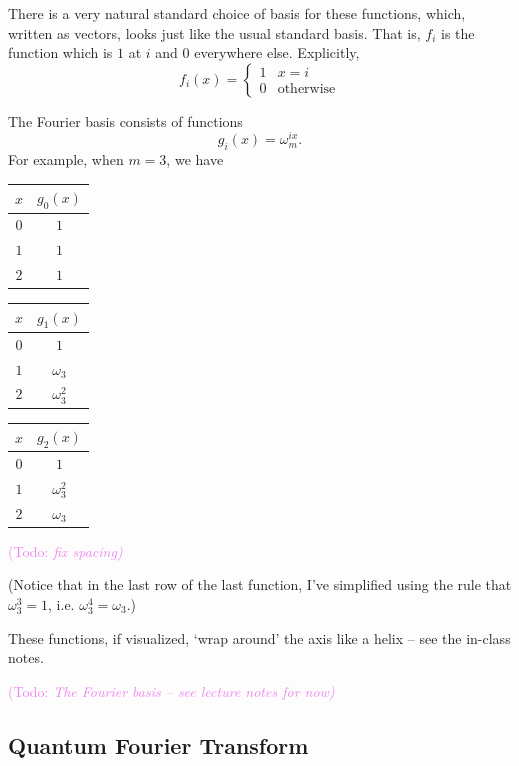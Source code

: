 \documentclass{article}
\theoremstyle{plain}
\theoremstyle{definition}
\theoremstyle{remark}
\numberwithin{theorem}{section}
\newcommand{\KS}[1]{\textcolor{violet}{{\sf (Todo:} {\sl{#1})}}}
\newcommand{\KS}[1]{}
\begin{document}
There is a very natural standard choice of basis for these functions, which, written as vectors, looks just like the usual standard basis.  That is, $f_i$ is the function which is $1$ at $i$ and $0$ everywhere else.  Explicitly,
\[
f_i(x) = \left\{
\begin{array}{ll}
1 & x = i \\
0 & \text{otherwise}
\end{array}
\right.
\]

The Fourier basis consists of functions 
\[
g_i(x) = \omega_m^{ix}.
\]
For example, when $m=3$, we have
\vspace{1em}

\begin{center}
\begin{tabular}{c|c}
$x$ & $g_0(x)$ \\
\hline
$0$ & $1$ \\
$1$ & $1$ \\
$2$ & $1$
\end{tabular} \hfill
\begin{tabular}{c|c}
$x$ & $g_1(x)$ \\
\hline
$0$ & $1$ \\
$1$ & $\omega_3$ \\
$2$ & $\omega_3^2$
\end{tabular}
\hfill
\begin{tabular}{c|c}
$x$ & $g_2(x)$ \\
\hline
$0$ & $1$ \\
$1$ & $\omega_3^2$ \\
$2$ & $\omega_3$
\end{tabular}
\end{center}
\vspace{1em}
\KS{fix spacing}

(Notice that in the last row of the last function, I've simplified using the rule that $\omega_3^3 = 1$, i.e. $\omega_3^4 = \omega_3$.)

These functions, if visualized, `wrap around' the axis like a helix -- see the in-class notes.


\KS{The Fourier basis -- see lecture notes for now}

\subsection{Quantum Fourier Transform}
\end{document}
